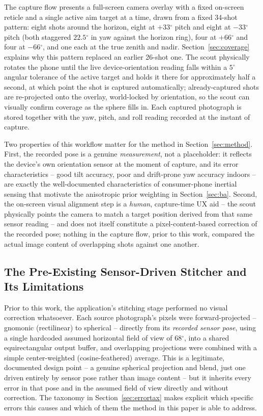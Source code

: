 \documentclass[11pt]{article}
\newcommand{\Deg}{\ensuremath{^{\circ}}}
\begin{document}
The capture flow presents a full-screen camera overlay with a fixed on-screen reticle and a single active aim target at a time, drawn from a fixed 34-shot pattern: eight shots around the horizon, eight at $+33\Deg$ pitch and eight at $-33\Deg$ pitch (both staggered $22.5\Deg$ in yaw against the horizon ring), four at $+66\Deg$ and four at $-66\Deg$, and one each at the true zenith and nadir. Section~\ref{sec:coverage} explains why this pattern replaced an earlier 26-shot one. The scout physically rotates the phone until the live device-orientation reading falls within a $5\Deg$ angular tolerance of the active target and holds it there for approximately half a second, at which point the shot is captured automatically; already-captured shots are re-projected onto the overlay, world-locked by orientation, so the scout can visually confirm coverage as the sphere fills in. Each captured photograph is stored together with the yaw, pitch, and roll reading recorded at the instant of capture.

Two properties of this workflow matter for the method in Section~\ref{sec:method}. First, the recorded pose is a genuine \emph{measurement}, not a placeholder: it reflects the device's own orientation sensor at the moment of capture, and its error characteristics -- good tilt accuracy, poor and drift-prone yaw accuracy indoors -- are exactly the well-documented characteristics of consumer-phone inertial sensing that motivate the anisotropic prior weighting in Section~\ref{sec:ba}. Second, the on-screen visual alignment step is a \emph{human}, capture-time UX aid -- the scout physically points the camera to match a target position derived from that same sensor reading -- and does not itself constitute a pixel-content-based correction of the recorded pose; nothing in the capture flow, prior to this work, compared the actual image content of overlapping shots against one another.

\subsection{The Pre-Existing Sensor-Driven Stitcher and Its Limitations}
\label{sec:priorstitcher}

Prior to this work, the application's stitching stage performed no visual correction whatsoever. Each source photograph's pixels were forward-projected -- gnomonic (rectilinear) to spherical -- directly from its \emph{recorded sensor pose}, using a single hardcoded assumed horizontal field of view of $68\Deg$, into a shared equirectangular output buffer, and overlapping projections were combined with a simple center-weighted (cosine-feathered) average. This is a legitimate, documented design point -- a genuine spherical projection and blend, just one driven entirely by sensor pose rather than image content -- but it inherits every error in that pose and in the assumed field of view directly and without correction. The taxonomy in Section~\ref{sec:errortax} makes explicit which specific errors this causes and which of them the method in this paper is able to address.
\end{document}

